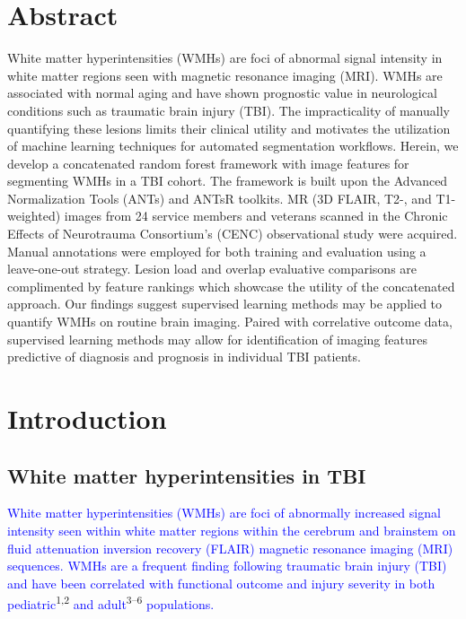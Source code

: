 \documentclass[11pt,]{article}
\title{}
\author{}
\date{}
\begin{document}
\maketitle


\section{Abstract}\label{abstract}

White matter hyperintensities (WMHs) are foci of abnormal signal
intensity in white matter regions seen with magnetic resonance imaging
(MRI). WMHs are associated with normal aging and have shown prognostic
value in neurological conditions such as traumatic brain injury (TBI).
The impracticality of manually quantifying these lesions limits their
clinical utility and motivates the utilization of machine learning
techniques for automated segmentation workflows. Herein, we develop a
concatenated random forest framework with image features for segmenting
WMHs in a TBI cohort. The framework is built upon the Advanced
Normalization Tools (ANTs) and ANTsR toolkits. MR (3D FLAIR, T2-, and
T1-weighted) images from 24 service members and veterans scanned in the
Chronic Effects of Neurotrauma Consortium's (CENC) observational study
were acquired. Manual annotations were employed for both training and
evaluation using a leave-one-out strategy. Lesion load and overlap
evaluative comparisons are complimented by feature rankings which
showcase the utility of the concatenated approach. Our findings suggest
supervised learning methods may be applied to quantify WMHs on routine
brain imaging. Paired with correlative outcome data, supervised learning
methods may allow for identification of imaging features predictive of
diagnosis and prognosis in individual TBI patients.

\clearpage

\section{Introduction}\label{introduction}

\subsection{White matter hyperintensities in
TBI}\label{white-matter-hyperintensities-in-tbi}

\textcolor{blue}{White matter hyperintensities (WMHs) are foci of abnormally increased signal intensity seen within white matter regions within the cerebrum and brainstem on fluid attenuation inversion recovery (FLAIR) magnetic resonance imaging (MRI) sequences.
WMHs are a frequent finding following traumatic brain injury (TBI) and have been correlated with functional outcome and injury severity in both pediatric}\textsuperscript{1,2}
\textcolor{blue}{and adult}\textsuperscript{3--6}
\textcolor{blue}{populations.}
\end{document}

